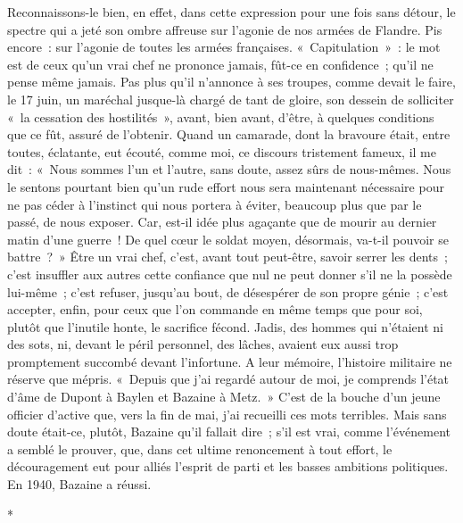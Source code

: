 \documentclass[french,twoside]{book} %
\begin{document}
Reconnaissons-le bien, en effet, dans cette expression pour une fois sans détour, le spectre qui a jeté son ombre affreuse sur l’agonie de nos armées de Flandre. Pis encore : sur l’agonie de toutes les armées françaises. « Capitulation » : le mot est de ceux qu’un vrai chef ne prononce jamais, fût-ce en confidence ; qu’il ne pense même jamais. Pas plus qu’il n’annonce à ses troupes, comme devait le faire, le 17 juin, un maréchal jusque-là chargé de tant de gloire, son dessein de solliciter « la cessation des hostilités », avant, bien avant, d’être, à quelques conditions que ce fût, assuré de l’obtenir. Quand un camarade, dont la bravoure était, entre toutes, éclatante, eut écouté, comme moi, ce discours tristement fameux, il me dit : « Nous sommes l’un et l’autre, sans doute, assez sûrs de nous-mêmes. Nous le sentons pourtant bien qu’un rude effort nous sera maintenant nécessaire pour ne pas céder à l’instinct qui nous portera à éviter, beaucoup plus que par le passé,   de nous exposer. Car, est-il idée plus agaçante que de mourir au dernier matin d’une guerre ! De quel cœur le soldat moyen, désormais, va-t-il pouvoir se battre ? » Être un vrai chef, c’est, avant tout peut-être, savoir serrer les dents ; c’est insuffler aux autres cette confiance que nul ne peut donner s’il ne la possède lui-même ; c’est refuser, jusqu’au bout, de désespérer de son propre génie ; c’est accepter, enfin, pour ceux que l’on commande en même temps que pour soi, plutôt que l’inutile honte, le sacrifice fécond. Jadis, des hommes qui n’étaient ni des sots, ni, devant le péril personnel, des lâches, avaient eux aussi trop promptement succombé devant l’infortune. A leur mémoire, l’histoire militaire ne réserve que mépris. « Depuis que j’ai regardé autour de moi, je comprends l’état d’âme de Dupont à Baylen et Bazaine à Metz. » C’est de la bouche d’un jeune officier d’active que, vers la fin de mai, j’ai recueilli ces mots terribles. Mais sans doute était-ce, plutôt, Bazaine qu’il fallait dire ; s’il est vrai, comme l’événement a semblé le prouver, que, dans cet ultime renoncement à tout effort, le découragement eut pour alliés l’esprit de parti et les basses ambitions politiques. En 1940, Bazaine a réussi.\par

\begin{center}
\noindent \centerline{*}\par
\end{center}
\end{document}

